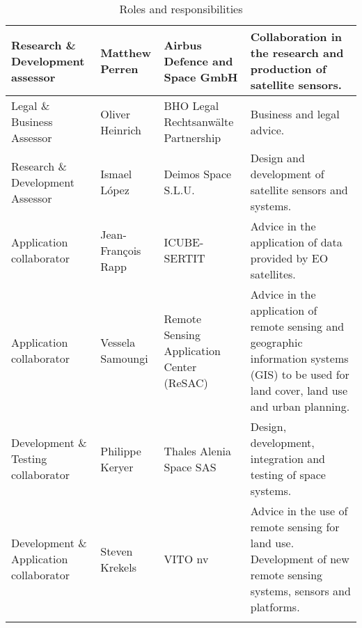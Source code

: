 \begin{center}
\begin{longtable}{>{\raggedright\arraybackslash}p{3cm}>{\raggedright\arraybackslash}p{3cm}>{\raggedright\arraybackslash}p{3cm}>{\raggedright\arraybackslash}p{5cm}}
		Research \& Development assessor & Matthew Perren & Airbus Defence and Space GmbH & Collaboration in the research and production of satellite sensors. \\ \hline
		Legal \& Business Assessor & Oliver Heinrich & BHO Legal Rechtsanwälte Partnership & Business and legal advice. \\ \hline
		Research \& Development Assessor & Ismael López & Deimos Space S.L.U. & Design and development of satellite sensors and systems. \\ \hline
		Application collaborator & Jean-François Rapp & ICUBE-SERTIT & Advice in the application of data provided by EO satellites. \\ \hline
		Application collaborator & Vessela Samoungi & Remote Sensing Application Center (ReSAC) & Advice in the application of remote sensing and geographic information systems (GIS) to be used for land cover, land use and urban planning. \\ \hline
		Development \& Testing collaborator & Philippe Keryer & Thales Alenia Space SAS & Design, development, integration and testing of space systems. \\ \hline
		Development \& Application collaborator & Steven Krekels & VITO nv & Advice in the use of remote sensing for land use. Development of new remote sensing systems, sensors and platforms. \\ \bottomrule[2pt]
		\caption{Roles and responsibilities}
		\label{table_roles}	
	\end{longtable}
\end{center}